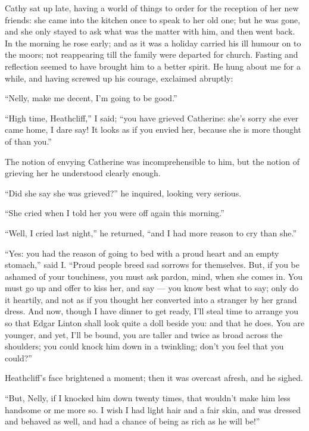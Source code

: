 \par Cathy sat up late, having a world of things to order for the reception of her new friends: she came into the kitchen once to speak to her old one; but he was gone, and she only stayed to ask what was the matter with him, and then went back. In the morning he rose early; and as it was a holiday carried his ill humour on to the moors; not reappearing till the family were departed for church. Fasting and reflection seemed to have brought him to a better spirit. He hung about me for a while, and having screwed up his courage, exclaimed abruptly:
\par “Nelly, make me decent, I'm going to be good.”
\par “High time, Heathcliff,” I said; “you have grieved Catherine: she's sorry she ever came home, I dare say! It looks as if you envied her, because she is more thought of than you.”
\par The notion of envying Catherine was incomprehensible to him, but the notion of grieving her he understood clearly enough.
\par “Did she say she was grieved?” he inquired, looking very serious.
\par “She cried when I told her you were off again this morning.”
\par “Well, I cried last night,” he returned, “and I had more reason to cry than she.”
\par “Yes: you had the reason of going to bed with a proud heart and an empty stomach,” said I. “Proud people breed sad sorrows for themselves. But, if you be ashamed of your touchiness, you must ask pardon, mind, when she comes in. You must go up and offer to kiss her, and say — you know best what to say; only do it heartily, and not as if you thought her converted into a stranger by her grand dress. And now, though I have dinner to get ready, I'll steal time to arrange you so that Edgar Linton shall look quite a doll beside you: and that he does. You are younger, and yet, I'll be bound, you are taller and twice as broad across the shoulders; you could knock him down in a twinkling; don't you feel that you could?”
\par Heathcliff's face brightened a moment; then it was overcast afresh, and he sighed.
\par “But, Nelly, if I knocked him down twenty times, that wouldn't make him less handsome or me more so. I wish I had light hair and a fair skin, and was dressed and behaved as well, and had a chance of being as rich as he will be!”
